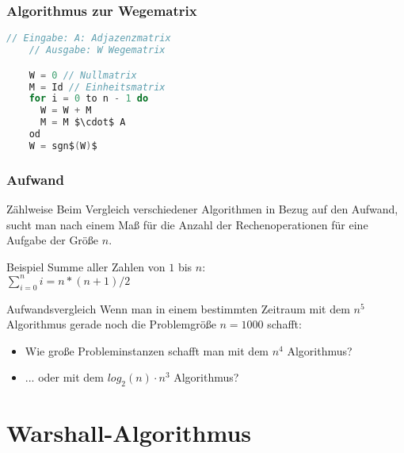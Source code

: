 \begin{frame}[fragile]
	\frametitle{Algorithmus zur Wegematrix}
  \begin{lstlisting}[language = Java,mathescape,morekeywords={set}]
    // Eingabe: A: Adjazenzmatrix
    // Ausgabe: W Wegematrix

    W = 0 // Nullmatrix
    M = Id // Einheitsmatrix
    for i = 0 to n - 1 do
      W = W + M
      M = M $\cdot$ A
    od
    W = sgn$(W)$
  \end{lstlisting}
\end{frame}

\begin{frame}
	\frametitle{Aufwand}
	\begin{block}{Zählweise}
		Beim Vergleich verschiedener Algorithmen in Bezug auf den Aufwand, sucht man nach einem Maß für die Anzahl der Rechenoperationen für eine Aufgabe der Größe $n$.
	\end{block}
	\begin{block}{Beispiel} \pause
		Summe aller Zahlen von $1$ bis $n$: \\
			$\sum^n_{i=0} i = $\pause$n*(n+1)/2$
	\end{block}
\end{frame}

\begin{frame}
	\begin{block}{Aufwandsvergleich}
		Wenn man in einem bestimmten Zeitraum mit dem $n^5$ Algorithmus gerade noch die Problemgröße $n=1000$ schafft:
	  \begin{itemize}
		  \item Wie große Probleminstanzen schafft man mit dem $n^4$ Algorithmus? \pause
		  \item ... oder mit dem $log_2(n) \cdot n^3$ Algorithmus?
	  \end{itemize}
	\end{block}
\end{frame}

\section{Warshall-Algorithmus}
